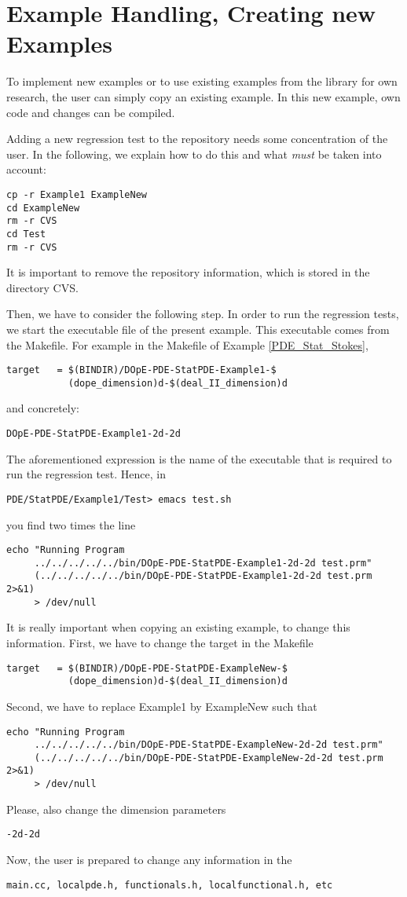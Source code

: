 \chapter{Example Handling, Creating new Examples}
\label{chap:howtoex}
To implement new examples or to use existing examples 
from the library for own research, the user 
can simply copy an existing example. In this 
new example, own code and changes can be compiled.

Adding a new regression test to the repository 
needs some concentration of the user. In the 
following, we explain how to do this and what 
\textit{must} be taken into account:
\begin{verbatim}
cp -r Example1 ExampleNew
cd ExampleNew
rm -r CVS
cd Test
rm -r CVS
\end{verbatim}
It is important to remove the repository information,
which is stored in the directory CVS.

Then, we have to consider the following step. In order to 
run the regression tests, we start the executable file
of the present example. This executable comes from the 
Makefile. For example in the Makefile of 
Example \ref{PDE_Stat_Stokes}, 
\begin{verbatim}
target   = $(BINDIR)/DOpE-PDE-StatPDE-Example1-$
           (dope_dimension)d-$(deal_II_dimension)d
\end{verbatim}
and concretely:
\begin{verbatim}
DOpE-PDE-StatPDE-Example1-2d-2d
\end{verbatim}
The aforementioned expression is the name of 
the executable that is required to run the 
regression test. Hence, in 
\begin{verbatim}
PDE/StatPDE/Example1/Test> emacs test.sh
\end{verbatim}
you find two times the line
\begin{verbatim}
echo "Running Program 
     ../../../../../bin/DOpE-PDE-StatPDE-Example1-2d-2d test.prm"
     (../../../../../bin/DOpE-PDE-StatPDE-Example1-2d-2d test.prm 2>&1) 
     > /dev/null
\end{verbatim} 
It is really important when copying an existing example,
to change this information. 
First, we have to change the target in the Makefile
\begin{verbatim}
target   = $(BINDIR)/DOpE-PDE-StatPDE-ExampleNew-$
           (dope_dimension)d-$(deal_II_dimension)d
\end{verbatim}
Second, we have to replace 
Example1 by ExampleNew such that 
\begin{verbatim}
echo "Running Program 
     ../../../../../bin/DOpE-PDE-StatPDE-ExampleNew-2d-2d test.prm"
     (../../../../../bin/DOpE-PDE-StatPDE-ExampleNew-2d-2d test.prm 2>&1) 
     > /dev/null
\end{verbatim} 
Please, also change the dimension parameters 
\begin{verbatim}
-2d-2d
\end{verbatim} 
Now, the user is prepared to change any information in the 
\begin{verbatim}
main.cc, localpde.h, functionals.h, localfunctional.h, etc
\end{verbatim} 

